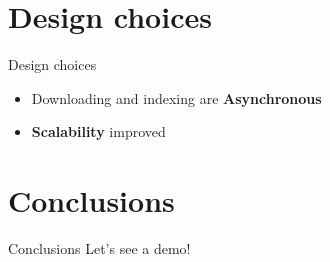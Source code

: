 \documentclass{beamer}
\begin{document}
\section{Design choices}
\begin{frame}{Design choices}
\begin{itemize}
    \item Downloading and indexing are \textbf{Asynchronous}
    \item \textbf{Scalability} improved
\end{itemize}
\end{frame}

\section{Conclusions}
\begin{frame}{Conclusions}
\centering
Let's see a demo!
\end{frame}
\end{document}
